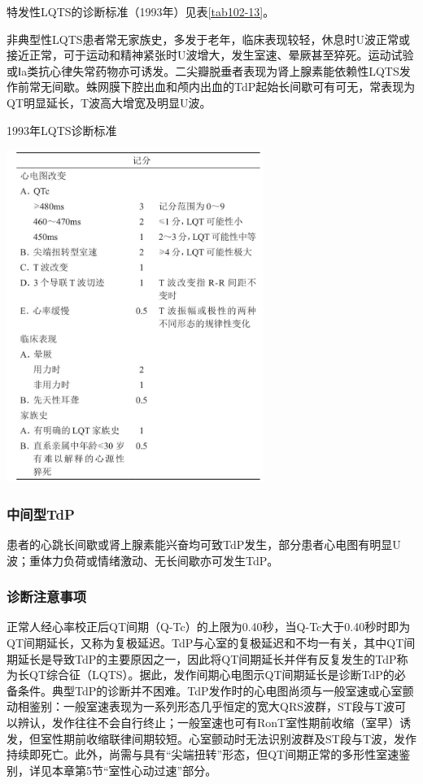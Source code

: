 特发性LQTS的诊断标准（1993年）见表\ref{tab102-13}。

非典型性LQTS患者常无家族史，多发于老年，临床表现较轻，休息时U波正常或接近正常，可于运动和精神紧张时U波增大，发生室速、晕厥甚至猝死。运动试验或Ⅰa类抗心律失常药物亦可诱发。二尖瓣脱垂者表现为肾上腺素能依赖性LQTS发作前常无间歇。蛛网膜下腔出血和颅内出血的TdP起始长间歇可有可无，常表现为QT明显延长，T波高大增宽及明显U波。

\begin{table}[htbp]
\centering
\caption{1993年LQTS诊断标准}
\label{tab102-13}
\includegraphics[width=3.29167in,height=4.26042in]{./images/Image00447.jpg}
\end{table}

\subsubsection{中间型TdP}

患者的心跳长间歇或肾上腺素能兴奋均可致TdP发生，部分患者心电图有明显U波；重体力负荷或情绪激动、无长间歇亦可发生TdP。

\subsubsection{诊断注意事项}

正常人经心率校正后QT间期（Q-Tc）的上限为0.40秒，当Q-Tc大于0.40秒时即为QT间期延长，又称为复极延迟。TdP与心室的复极延迟和不均一有关，其中QT间期延长是导致TdP的主要原因之一，因此将QT间期延长并伴有反复发生的TdP称为长QT综合征（LQTS）。据此，发作间期心电图示QT间期延长是诊断TdP的必备条件。典型TdP的诊断并不困难。TdP发作时的心电图尚须与一般室速或心室颤动相鉴别：一般室速表现为一系列形态几乎恒定的宽大QRS波群，ST段与T波可以辨认，发作往往不会自行终止；一般室速也可有RonT室性期前收缩（室早）诱发，但室性期前收缩联律间期较短。心室颤动时无法识别波群及ST段与T波，发作持续即死亡。此外，尚需与具有“尖端扭转”形态，但QT间期正常的多形性室速鉴别，详见本章第5节“室性心动过速”部分。

